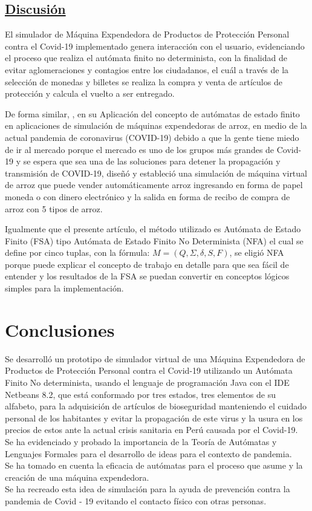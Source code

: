 \documentclass[10pt,conference]{IEEEtran}
\begin{document}
\subsection{\underline{\textbf{Discusión}}}

El simulador de Máquina Expendedora de Productos de Protección Personal contra el Covid-19 implementado genera interacción con el usuario, evidenciando el proceso que realiza el autómata finito no determinista, con la finalidad de evitar aglomeraciones y contagios entre los ciudadanos, el cuál a través de la selección de monedas y billetes se realiza la compra y venta de artículos de protección y calcula el vuelto a ser entregado. 

De forma similar, , en su Aplicación del concepto de autómatas de estado finito en aplicaciones de simulación de máquinas expendedoras de arroz, en medio de la actual pandemia de coronavirus (COVID-19) debido a que la gente tiene miedo de ir al mercado porque el mercado es uno de los grupos más grandes de Covid-19 y se espera que sea una de las soluciones para detener la propagación y transmisión de COVID-19, diseñó y estableció una simulación de máquina virtual de arroz que puede vender automáticamente arroz ingresando en forma de papel moneda o con dinero electrónico y la salida en forma de recibo de compra de arroz con 5 tipos de arroz. 

Igualmente que el presente artículo, el método utilizado es Autómata de Estado Finito (FSA) tipo Autómata de Estado Finito No Determinista (NFA) el cual se define por cinco tuplas, con la fórmula: $M = (Q, \Sigma, \delta, S, F)$, se eligió NFA porque puede explicar el concepto de trabajo en detalle para que sea fácil de entender y los resultados de la FSA se puedan convertir en conceptos lógicos simples para la implementación.

\section{\textbf{Conclusiones}}
Se desarrolló un prototipo de simulador virtual de una Máquina Expendedora de Productos de Protección Personal contra el Covid-19 utilizando un Autómata Finito No determinista, usando el lenguaje de programación Java con el IDE Netbeans 8.2, que está conformado por tres estados, tres elementos de su alfabeto, para la adquisición de artículos de bioseguridad manteniendo el cuidado personal de los habitantes y evitar la propagación de este virus y la usura en los precios de estos ante la actual crisis sanitaria en Perú causada por el Covid-19.
\\
Se ha evidenciado y probado la importancia de la Teoría de Autómatas y Lenguajes Formales para el desarrollo de ideas para el contexto de pandemia.
\\
Se ha tomado en cuenta la eficacia de autómatas para el proceso que asume y la creación de una máquina expendedora.
\\
Se ha recreado esta idea de simulación para la ayuda de prevención contra la pandemia de Covid - 19 evitando el contacto físico con otras personas.



\end{document}
